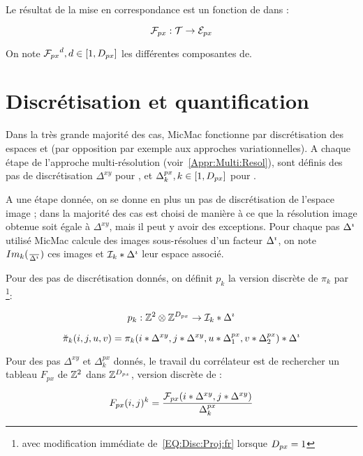 Le r\'esultat de la mise en correspondance est un fonction  \FPx de
\ETer dans \EPx:

\begin{equation}
   \FPx :   \ETer  \rightarrow  \EPx
\end{equation}

On note ${\FPx}^d,d\in [1,\DimPx]$ les diff\'erentes composantes de\FPx.



\section{Discr\'etisation et quantification}

\label{Disc:Quant:fr}

Dans la tr\`es grande majorit\'e des cas,
MicMac  fonctionne par discr\'etisation
des espaces \ETer et \EPx (par opposition par exemple aux
approches variationnelles). A chaque \'etape
de l'approche multi-r\'esolution (voir~\ref{Appr:Multi:Resol}), sont
d\'efinis des pas de discr\'etisation  $\Delta^{xy}$ pour \ETer ,
et $\Delta^{px}_k, k \in [1,\DimPx]$ pour  \EPx.

A une \'etape donn\'ee, on se donne en plus un pas de
discr\'etisation de l'espace image \DeltaI; dans
la  majorit\'e des cas \DeltaI est choisi
de mani\`ere \`a ce que la r\'esolution image obtenue soit
\'egale \`a  $\Delta^{xy}$,
mais il peut y avoir des exceptions. Pour chaque pas $\DeltaI$
utilis\'e MicMac calcule des images sous-r\'esolues d'un facteur
$\DeltaI$, on note $Im_k(\frac{}{\DeltaI})$ ces images et
$\EIm*\DeltaI$ leur espace associ\'e.


Pour des pas de discr\'etisation donn\'es,
on d\'efinit $p_k$ la version discr\`ete de $\pi_k$ par
\footnote{avec modification imm\'ediate de~\ref{EQ:Disc:Proj:fr}
lorsque $\DimPx=1$}:

\begin{equation}
   p_k : \ZZ^2 \otimes\ZZ^{\DimPx} \rightarrow \EIm*\DeltaI
\end{equation}

\begin{equation}
   \breve\pi_k(i,j,u,v) = \pi_k(i*\Delta^{xy},j*\Delta^{xy},u*\Delta^{px}_1,v*\Delta^{px}_2)*\DeltaI
\label{EQ:Disc:Proj:fr}
\end{equation}

Pour des pas   $\Delta^{xy}$ et $\Delta^{px}_k$ donn\'es, le travail
du corr\'elateur est de rechercher un tableau $F_{px}$ de $\ZZ^2$ dans
$\ZZ^{\DimPx}$, version discr\`ete de \FPx:

\begin{equation}
   F_{px}(i,j)^k = \frac{\FPx(i*\Delta^{xy},j*\Delta^{xy})}{\Delta^{px}_k}
\end{equation}



